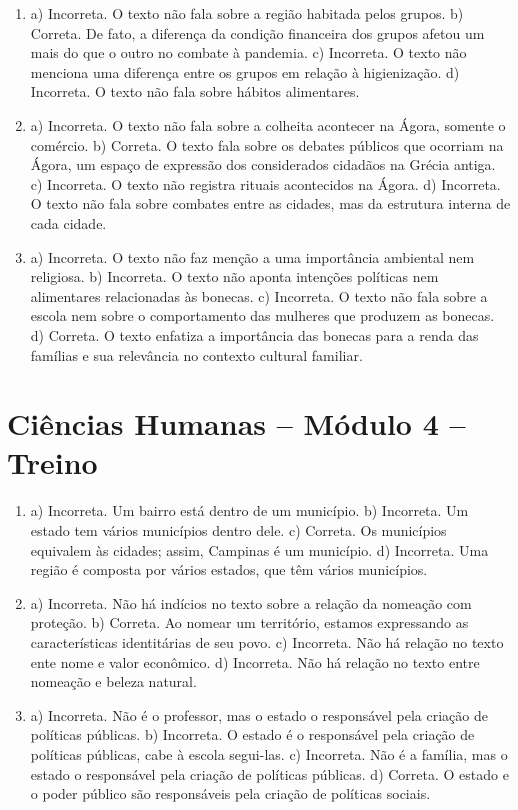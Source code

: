 \begin{enumerate}
\item
a) Incorreta. O texto não fala sobre a região habitada pelos grupos.
b) Correta. De fato, a diferença da condição financeira dos grupos
afetou um mais do que o outro no combate à pandemia.
c) Incorreta. O texto não menciona uma diferença entre os grupos em relação à
higienização.
d) Incorreta. O texto não fala sobre hábitos alimentares.

\item
a) Incorreta. O texto não fala sobre a colheita acontecer na Ágora,
somente o comércio.
b) Correta. O texto fala sobre os debates públicos que ocorriam na
Ágora, um espaço de expressão dos considerados cidadãos na Grécia
antiga.
c) Incorreta. O texto não registra rituais acontecidos na Ágora.
d) Incorreta. O texto não fala sobre combates entre as cidades, mas da
estrutura interna de cada cidade.

\item
a) Incorreta. O texto não faz menção a uma importância ambiental nem
religiosa.
b) Incorreta. O texto não aponta intenções políticas nem alimentares
relacionadas às bonecas.
c) Incorreta. O texto não fala sobre a escola nem sobre o comportamento
das mulheres que produzem as bonecas.
d) Correta. O texto enfatiza a importância das bonecas para a renda das
famílias e sua relevância no contexto cultural familiar.
\end{enumerate}

\section*{Ciências Humanas – Módulo 4 – Treino}

\begin{enumerate}
\item
a) Incorreta. Um bairro está dentro de um município.
b) Incorreta. Um estado tem vários municípios dentro dele.
c) Correta. Os municípios equivalem às cidades; assim, Campinas é um
município.
d) Incorreta. Uma região é composta por vários estados, que têm vários
municípios.

\item
a) Incorreta. Não há indícios no texto sobre a relação da nomeação com
proteção.
b) Correta. Ao nomear um território, estamos expressando as
características identitárias de seu povo.
c) Incorreta. Não há relação no texto ente nome e valor econômico.
d) Incorreta. Não há relação no texto entre nomeação e beleza natural.

\item
a) Incorreta. Não é o professor, mas o estado o responsável pela criação
de políticas públicas.
b) Incorreta. O estado é o responsável pela criação de políticas
públicas, cabe à escola segui-las.
c) Incorreta. Não é a família, mas o estado o responsável pela criação
de políticas públicas.
d) Correta. O estado e o poder público são responsáveis pela criação de
políticas sociais.
\end{enumerate}

